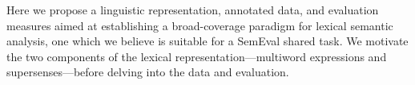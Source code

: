 \documentclass[11pt]{article}
\newcommand{\ensuretext}[1]{#1}
\newcommand{\nssmarker}{\ensuretext{\textcolor{magenta}{\ensuremath{^{\textsc{NS}}_{\textsc{S}}}}}}
\newcommand{\arkcomment}[3]{\ensuretext{\textcolor{#3}{[#1 #2]}}}
\newcommand{\nss}[1]{\arkcomment{\nssmarker}{#1}{magenta}}
\begin{document}
Here we propose a linguistic representation, annotated data, and evaluation measures 
aimed at establishing a broad-coverage paradigm for lexical semantic analysis, 
one which we believe is suitable for a SemEval shared task. 
We motivate the two components of the lexical representation---multiword expressions 
and supersenses---before delving into the data and evaluation.

\end{document}
